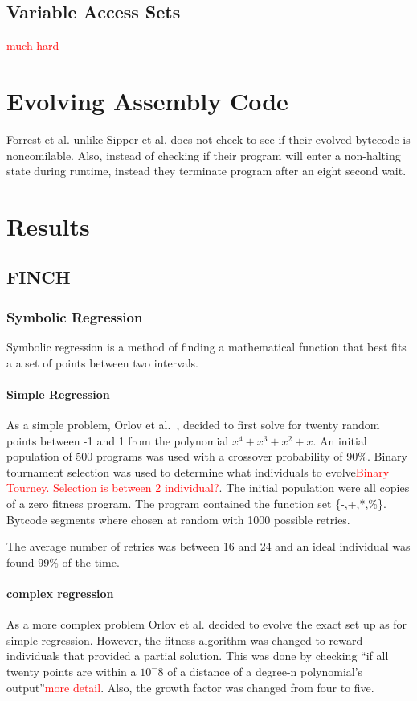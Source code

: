 \documentclass{sig-alternate}
\newcommand{\mycomment}[1]{\textcolor{red}{#1}}
\begin{document}
\subsection{Variable Access Sets}
\cite{FINCH2:2009} \mycomment{much hard}


\section{Evolving Assembly Code}
	Forrest et al.\cite{Assembly:2010} unlike Sipper et al.\cite{FINCH:2011} does not check to see if their evolved bytecode is noncomilable. Also, instead of checking if their program will enter a non-halting state during runtime, instead they terminate program after an eight second wait.



\section{Results}
\subsection{FINCH}
\subsubsection{Symbolic Regression}
Symbolic regression is a method of finding a mathematical function that best fits a a set of points between two intervals.
\paragraph{Simple Regression}
	 As a simple problem, Orlov et al.~\cite{FINCH:2011}, decided to first solve for twenty random points between -1 and 1 from the polynomial \begin{math}x^4+x^3+x^2+x\end{math}. An initial population of 500 programs was used with a crossover probability of 90\%. Binary tournament selection was used to determine what individuals to evolve\mycomment{Binary Tourney. Selection is between 2 individual?}. The initial population were all copies of a zero fitness program. The program contained the function set \{-,+,*,\%\}. Bytcode segments where chosen at random with 1000 possible retries.
		
	The average number of retries was between 16 and 24 and an ideal individual was found 99\% of the time.

	
\paragraph{complex regression}		
	As a more complex problem Orlov et al. decided to evolve the exact set up as for simple regression. However, the fitness algorithm was changed to reward individuals that provided a partial solution. This was done by checking ``if all twenty points are within a \begin{math}10^-8\end{math} of a distance of a degree-n polynomial's output''\mycomment{more detail}. Also, the growth factor was changed from four to five.
	
\end{document}
